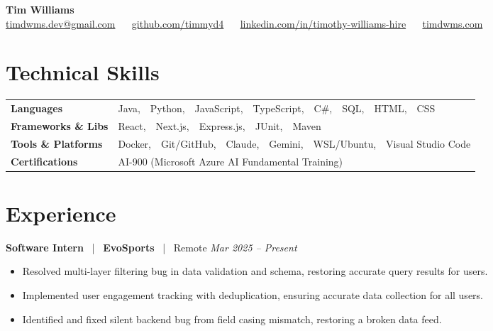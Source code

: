 \documentclass[10pt, letterpaper]{article}
\newcommand{\jobhead}[4]{%
  \vspace{5pt}%
  {\bfseries\color{dark}#1}%
  ~{\color{light}|}~%
  {\bfseries\color{navy}#2}%
  ~{\color{light}|}~%
  {\color{light}#3}%
  \hfill{\color{light}\small\textit{#4}}\\[-2pt]%
}
\newcommand{\skillrow}[2]{%
  {\bfseries #1} & #2 \\[2pt]%
}
\begin{document}

\begin{center}
  {\huge\bfseries\color{navy} Tim Williams}\\[4pt]
  {\small\color{light}
    \href{mailto:timdwms.dev@gmail.com}{timdwms.dev@gmail.com}
    ~\textbullet~
    \href{https://github.com/timmyd4}{github.com/timmyd4}
    ~\textbullet~
    \href{https://www.linkedin.com/in/timothy-williams-hire}{linkedin.com/in/timothy-williams-hire}
    ~\textbullet~
    \href{https://timdwms.com}{timdwms.com}
  }
\end{center}

\vspace{2pt}

\section{Technical Skills}

\begin{tabular}{@{}p{1.6in} p{5.2in}@{}}
  \skillrow{Languages}{Java,\ \ Python,\ \ JavaScript,\ \ TypeScript,\ \ C\#,\ \ SQL,\ \ HTML,\ \ CSS}
  \skillrow{Frameworks \& Libs}{React,\ \ Next.js,\ \ Express.js,\ \ JUnit,\ \ Maven}
  \skillrow{Tools \& Platforms}{Docker,\ \ Git/GitHub,\ \ Claude,\ \ Gemini,\ \ WSL/Ubuntu,\ \ Visual Studio Code}
  \skillrow{Certifications}{AI-900 (Microsoft Azure AI Fundamental Training)}
\end{tabular}

\section{Experience}

\jobhead{Software Intern}{EvoSports}{Remote}{Mar 2025 – Present}
\begin{itemize}
  \item Resolved multi-layer filtering bug in data validation and schema, restoring accurate query results for users.
  \item Implemented user engagement tracking with deduplication, ensuring accurate data collection for all users.
  \item Identified and fixed silent backend bug from field casing mismatch, restoring a broken data feed.
\end{itemize}
\end{document}
